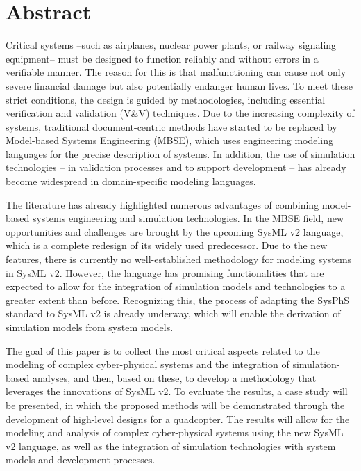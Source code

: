 \vfill
\selectenglish


\chapter*{Abstract}

Critical systems –such as airplanes, nuclear power plants, or railway signaling equipment– must be designed to function reliably and without errors in a verifiable manner. The reason for this is that malfunctioning can cause not only severe financial damage but also potentially endanger human lives. To meet these strict conditions, the design is guided by methodologies, including essential verification and validation (V\&V) techniques. Due to the increasing complexity of systems, traditional document-centric methods have started to be replaced by Model-based Systems Engineering (MBSE), which uses engineering modeling languages for the precise description of systems. In addition, the use of simulation technologies – in validation processes and to support development – has already become widespread in domain-specific modeling languages.

The literature has already highlighted numerous advantages of combining model-based systems engineering and simulation technologies. In the MBSE field, new opportunities and challenges are brought by the upcoming SysML v2 language, which is a complete redesign of its widely used predecessor. Due to the new features, there is currently no well-established methodology for modeling systems in SysML v2. However, the language has promising functionalities that are expected to allow for the integration of simulation models and technologies to a greater extent than before. Recognizing this, the process of adapting the SysPhS standard to SysML v2 is already underway, which will enable the derivation of simulation models from system models.

The goal of this paper is to collect the most critical aspects related to the modeling of complex cyber-physical systems and the integration of simulation-based analyses, and then, based on these, to develop a methodology that leverages the innovations of SysML v2. To evaluate the results, a case study will be presented, in which the proposed methods will be demonstrated through the development of high-level designs for a quadcopter. The results will allow for the modeling and analysis of complex cyber-physical systems using the new SysML v2 language, as well as the integration of simulation technologies with system models and development processes.

\vfill
\cleardoublepage

\selectthesislanguage

\setcounter{romanPage}{\value{page}}
